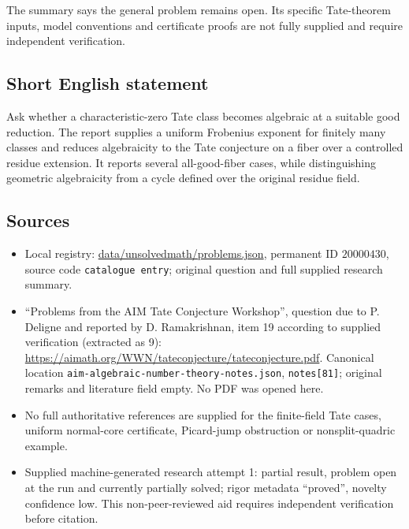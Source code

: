 \documentclass[11pt]{article}
\begin{document}
The summary says the general problem remains open. Its specific Tate-theorem inputs, model conventions and certificate proofs are not fully supplied and require independent verification.
\subsection{Short English statement}
Ask whether a characteristic-zero Tate class becomes algebraic at a suitable good reduction. The report supplies a uniform Frobenius exponent for finitely many classes and reduces algebraicity to the Tate conjecture on a fiber over a controlled residue extension. It reports several all-good-fiber cases, while distinguishing geometric algebraicity from a cycle defined over the original residue field.
\subsection{Sources}
\begin{itemize}
\item Local registry: \url{data/unsolvedmath/problems.json}, permanent ID $20000430$, source code \texttt{catalogue entry}; original question and full supplied research summary.
\item ``Problems from the AIM Tate Conjecture Workshop'', question due to P. Deligne and reported by D. Ramakrishnan, item 19 according to supplied verification (extracted as 9): \url{https://aimath.org/WWN/tateconjecture/tateconjecture.pdf}. Canonical location \texttt{aim-algebraic-number-theory-notes.json}, \texttt{notes[81]}; original remarks and literature field empty. No PDF was opened here.
\item No full authoritative references are supplied for the finite-field Tate cases, uniform normal-core certificate, Picard-jump obstruction or nonsplit-quadric example.
\item Supplied machine-generated research attempt 1: partial result, problem open at the run and currently partially solved; rigor metadata ``proved'', novelty confidence low. This non-peer-reviewed aid requires independent verification before citation.
\end{itemize}
\end{document}
